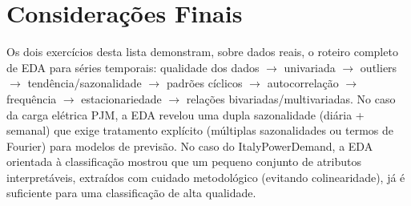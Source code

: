 \documentclass[12pt,a4paper]{article}
\begin{document}
\newpage
\section{Considerações Finais}

Os dois exercícios desta lista demonstram, sobre dados reais, o roteiro completo de EDA para séries temporais: qualidade dos dados $\rightarrow$ univariada $\rightarrow$ outliers $\rightarrow$ tendência/sazonalidade $\rightarrow$ padrões cíclicos $\rightarrow$ autocorrelação $\rightarrow$ frequência $\rightarrow$ estacionariedade $\rightarrow$ relações bivariadas/multivariadas. No caso da carga elétrica PJM, a EDA revelou uma dupla sazonalidade (diária + semanal) que exige tratamento explícito (múltiplas sazonalidades ou termos de Fourier) para modelos de previsão. No caso do ItalyPowerDemand, a EDA orientada à classificação mostrou que um pequeno conjunto de atributos interpretáveis, extraídos com cuidado metodológico (evitando colinearidade), já é suficiente para uma classificação de alta qualidade.
\end{document}
